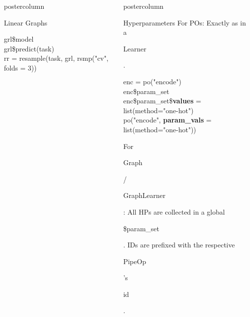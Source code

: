 \documentclass{beamer}
\newlength{\columnheight} %
\newcommand{\codeinline}[1]{\begin{codeboxinline}#1\end{codeboxinline}}
\begin{document}
\begin{frame}[fragile]{}
\begin{columns}
\begin{column}{.245\textwidth}
\begin{beamercolorbox}[center]{postercolumn}
\begin{minipage}{.98\textwidth}
{\begin{myblock}{Linear Graphs}
\begin{codeboxexample}
{                  grl\$model\\
                  grl\$predict(task)\\
                  rr = resample(task, grl, rsmp("cv", folds = 3))
              }
              \end{codeboxexample}
            \end{myblock}
						\vfill}
				\end{minipage}
			\end{beamercolorbox}
		\end{column}
		\begin{column}{.245\textwidth}
			\begin{beamercolorbox}[center]{postercolumn}
				\begin{minipage}{.98\textwidth}
					\parbox[t][\columnheight]{\textwidth}{
            \begin{myblock}{Hyperparameters}
              \vspace{-0.5em}
              For POs: Exactly as in a \codeinline{Learner}.
              \begin{codeboxmultiline}[width=26cm]
                {\footnotesize enc = po("encode") \\
                enc\$param\_set\\
                enc\$param\_set\$\textbf{values} = list(method="one-hot") \\
                po("encode", \textbf{param\_vals} = list(method="one-hot"))}
              \end{codeboxmultiline}
              For \codeinline{Graph} / \codeinline{GraphLearner}: All HPs are collected in a global \codeinline{\$param\_set}. IDs are prefixed with the respective \codeinline{PipeOp}'s \codeinline{id}.

\end{myblock}}
\end{minipage}
\end{beamercolorbox}
\end{column}
\end{columns}
\end{frame}
\end{document}
